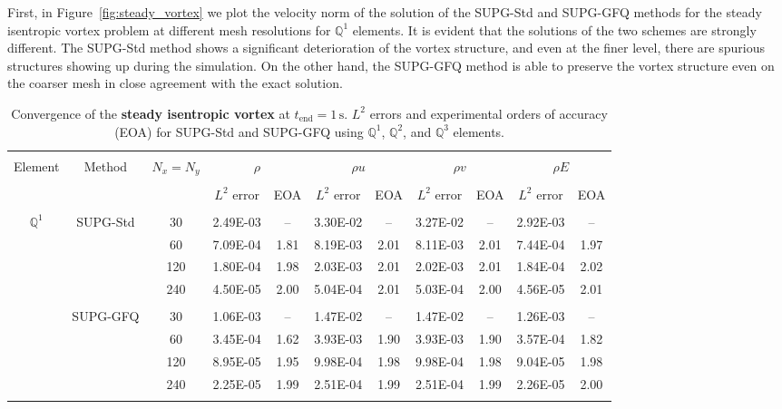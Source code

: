 \documentclass[a4paper,10pt]{article}
\renewcommand{\arraystretch}{0}  %
\begin{document}
First, in Figure~\ref{fig:steady_vortex} we plot the velocity norm of the solution of the SUPG-Std and SUPG-GFQ methods for the steady isentropic vortex problem at different mesh resolutions for $\mathbb Q^1$ elements. It is evident that the solutions of the two schemes are strongly different. The SUPG-Std method shows a significant deterioration of the vortex structure, and even at the finer level, there are spurious structures showing up during the simulation. On the other hand, the SUPG-GFQ method is able to preserve the vortex structure even on the coarser mesh in close agreement with the exact solution.

 \begin{table}[htbp]
	\small
	\centering
	\caption{Convergence of the \textbf{steady isentropic vortex} at $t_{\mathrm{end}} = 1\,\mathrm{s}$.
		$L^2$ errors and experimental orders of accuracy (EOA) for SUPG-Std and SUPG-GFQ
		using $\mathbb{Q}^1$, $\mathbb{Q}^2$, and $\mathbb{Q}^3$ elements.}
	\label{tab:st_vortex_conv}
	\begin{tabular}{c |c |c|cc|cc|cc|cc}
		\hline\\[3pt]
		Element & Method & $N_x=N_y$
		& \multicolumn{2}{c|}{$\rho$}
		& \multicolumn{2}{c|}{$\rho u$}
		& \multicolumn{2}{c|}{$\rho v$}
		& \multicolumn{2}{c}{$\rho E$} \\[3pt]
		\hline\\[3pt]
		& & 
		& $L^2$ error & EOA
		& $L^2$ error & EOA
		& $L^2$ error & EOA
		& $L^2$ error & EOA \\[5pt]
		\hline\\[3pt]
		
		\multirow{8}{*}{$\mathbb{Q}^1$}
		& \multirow{4}{*}{SUPG-Std}
		&   30  & 2.49E-03 & --   & 3.30E-02 & --   & 3.27E-02 & --   & 2.92E-03 & --  \\[5pt]
		& & 60  & 7.09E-04 & 1.81 & 8.19E-03 & 2.01 & 8.11E-03 & 2.01 & 7.44E-04 & 1.97 \\[5pt]
		& & 120 & 1.80E-04 & 1.98 & 2.03E-03 & 2.01 & 2.02E-03 & 2.01 & 1.84E-04 & 2.02 \\[5pt]
		& & 240 & 4.50E-05 & 2.00 & 5.04E-04 & 2.01 & 5.03E-04 & 2.00 & 4.56E-05 & 2.01 \\[5pt]
		\cline{2-11}\\[3pt]
		& \multirow{4}{*}{SUPG-GFQ}
		&   30  & 1.06E-03 & --   & 1.47E-02 & --   & 1.47E-02 & --   & 1.26E-03 & --  \\[5pt]
		& & 60  & 3.45E-04 & 1.62 & 3.93E-03 & 1.90 & 3.93E-03 & 1.90 & 3.57E-04 & 1.82 \\[5pt]
		& & 120 & 8.95E-05 & 1.95 & 9.98E-04 & 1.98 & 9.98E-04 & 1.98 & 9.04E-05 & 1.98 \\[5pt]
		& & 240 & 2.25E-05 & 1.99 & 2.51E-04 & 1.99 & 2.51E-04 & 1.99 & 2.26E-05 & 2.00 \\[5pt]
		\hline\\[3pt]
		

\end{tabular}
\end{table}
\end{document}
